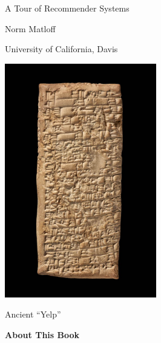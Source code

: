 \pagecolor{yellow}
\color{black}

\bigskip

\begin{center}
{\Huge A Tour of Recommender Systems}

{\LARGE Norm Matloff 

\medskip

University of California, Davis}

\bigskip

\vspace{0.5in}



\includegraphics[width=2.6in]{Images/AncientYelp.jpg}

Ancient ``Yelp''

\end{center}

\vspace{1.0in}




\newpage

\begin{center}
\Large{\textbf{About This Book}}
\end{center}

